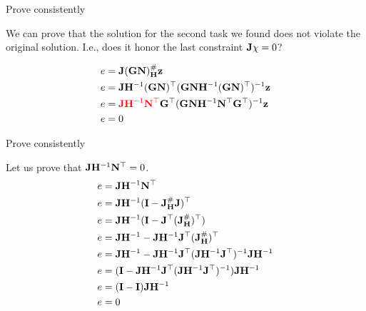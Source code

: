 \documentclass{beamer}
\newcommand{\iH} {\mathbf{H}^{-1}}
\newcommand{\JH} {\bo{J}^\#_\bo{H}}
\begin{document}
\begin{frame}{Prove consistently}
	\begin{flushleft}
		
		We can prove that the solution for the second task we found does not violate the original solution. I.e.,	does it honor the last constraint $\mathbf{J} \chi = 0$?
		
		\begin{align}
			e &= \bo{J}(\bo{G}\bo{N})_\bo{H}^\# \bo{z} \\
			e &= \bo{J}\iH (\bo{G}\bo{N})\T (\bo{G}\bo{N} \iH (\bo{G}\bo{N})\T)^{-1} \bo{z}\\
			e &= \textcolor{red}{\bo{J}\iH \bo{N}\T}  \bo{G}\T (\bo{G}\bo{N} \iH \bo{N}\T \bo{G}\T)^{-1} \bo{z} \\
			e &= 0
		\end{align}
		
	\end{flushleft}
\end{frame}




\begin{frame}{Prove consistently}
	\begin{flushleft}
		
		
		Let us prove that $\bo{J}\iH \bo{N}\T = 0$.
		\begin{align}
			e &= \bo{J} \iH \bo{N}\T \\
			e &= \bo{J} \iH (\bo{I} - \JH \bo{J})\T  \\
			e &= \bo{J} \iH (\bo{I} - \bo{J}\T (\JH)\T )  \\
			e &= \bo{J} \iH - \bo{J} \iH \bo{J}\T (\JH)\T   \\
			e &= \bo{J} \iH - \bo{J} \iH \bo{J}\T (\bo{J} \iH \bo{J}\T)^{-1} \bo{J} \iH 
			\\
			e &= (\bo{I} - \bo{J} \iH \bo{J}\T (\bo{J} \iH \bo{J}\T)^{-1}) \bo{J} \iH 
			\\
			e &= (\bo{I} - \bo{I}) \bo{J} \iH 
			\\
			e &= 0 
		\end{align}
		
	\end{flushleft}
\end{frame}
\end{document}
